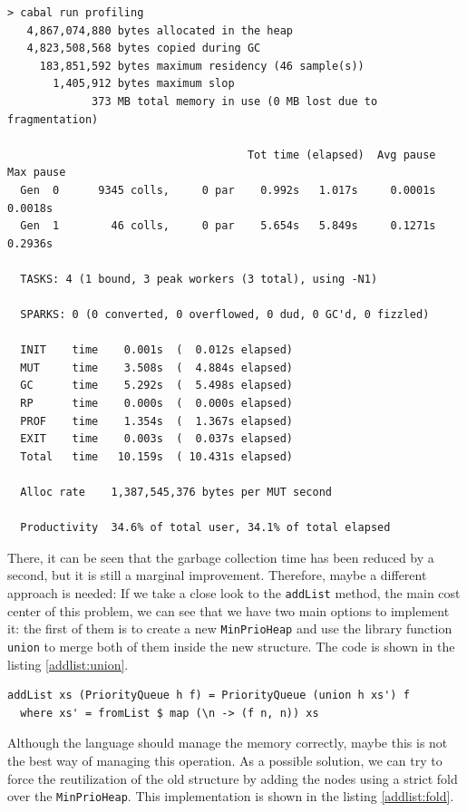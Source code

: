 \begin{lstlisting}
> cabal run profiling
   4,867,074,880 bytes allocated in the heap
   4,823,508,568 bytes copied during GC
     183,851,592 bytes maximum residency (46 sample(s))
       1,405,912 bytes maximum slop
             373 MB total memory in use (0 MB lost due to fragmentation)

                                     Tot time (elapsed)  Avg pause  Max pause
  Gen  0      9345 colls,     0 par    0.992s   1.017s     0.0001s    0.0018s
  Gen  1        46 colls,     0 par    5.654s   5.849s     0.1271s    0.2936s

  TASKS: 4 (1 bound, 3 peak workers (3 total), using -N1)

  SPARKS: 0 (0 converted, 0 overflowed, 0 dud, 0 GC'd, 0 fizzled)

  INIT    time    0.001s  (  0.012s elapsed)
  MUT     time    3.508s  (  4.884s elapsed)
  GC      time    5.292s  (  5.498s elapsed)
  RP      time    0.000s  (  0.000s elapsed)
  PROF    time    1.354s  (  1.367s elapsed)
  EXIT    time    0.003s  (  0.037s elapsed)
  Total   time   10.159s  ( 10.431s elapsed)

  Alloc rate    1,387,545,376 bytes per MUT second

  Productivity  34.6% of total user, 34.1% of total elapsed
\end{lstlisting}


There, it can be seen that the garbage collection time has been reduced by a
second, but it is still a marginal improvement. Therefore, maybe a different
approach is needed: If we take a close look to the \texttt{addList} method, the
main cost center of this problem, we can see that we have two main options to
implement it: the first of them is to create a new \texttt{MinPrioHeap} and use
the library function \texttt{union} to merge both of them inside the new
structure. The code is shown in the listing \ref{addlist:union}.\\

\begin{lstlisting}[style=haskell, caption= \texttt{addList} using
  \texttt{union}, label=addlist:union]
addList xs (PriorityQueue h f) = PriorityQueue (union h xs') f
  where xs' = fromList $ map (\n -> (f n, n)) xs
\end{lstlisting}

Although the language should manage the memory correctly, maybe this is not the
best way of managing this operation. As a possible solution, we can try to
force the reutilization of the old structure by adding the nodes using a strict
fold over the \texttt{MinPrioHeap}. This implementation is shown in the listing
\ref{addlist:fold}.\\

